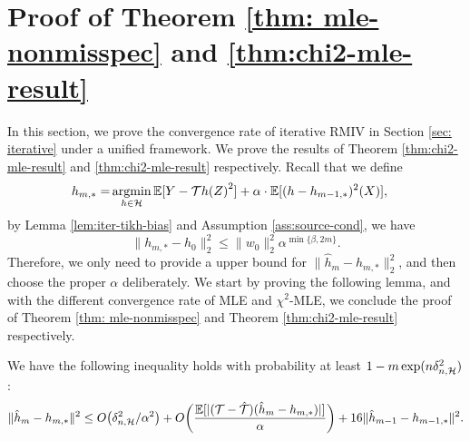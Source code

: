 \section{Proof of Theorem \ref{thm: mle-nonmisspec} and \ref{thm:chi2-mle-result}}\label{sec: proof-iterative}
In this section, we prove the convergence rate of iterative RMIV in Section \ref{sec: iterative} under a unified framework. We prove the results of Theorem \ref{thm:chi2-mle-result} and \ref{thm:chi2-mle-result} respectively. Recall that we define \begin{align*}
    h_{m, *} = &\mathop{\mathrm{argmin}}_{h\in\mathcal{H}} \mathbb{E}[{Y - {\mathcal{T}} h(Z)}^2]+ \alpha\cdot \mathbb{E}[(h - h_{m-1,*})^2(X)],
\end{align*}
by Lemma \ref{lem:iter-tikh-bias} and Assumption \ref{ass:source-cond}, we have $$
\|h_{m,*} - h_0\|_2^2 \leq \|w_0\|_2^2\alpha^{\min\{\beta,2m\}}.
$$
Therefore, we only need to provide a upper bound for $\|\hat{h}_m - h_{m,*}\|_2^2$, and then choose the proper $\alpha$ deliberately. We start by proving the following lemma, and with the different convergence rate of MLE and $\chi^2$-MLE, we conclude the proof of Theorem \ref{thm: mle-nonmisspec} and Theorem \ref{thm:chi2-mle-result} respectively.
\begin{lemma}\label{lem: iter-quadra}
   We have the following inequality holds with probability at least $1 - m\exp(n\delta_{n,\mathcal{H}}^2)$: $$\|\hat{h}_{m} - h_{m,*}\|^2 \leq O\big(\delta_{n,\mathcal{H}}^2/\alpha^2 
\big) + O\bigg(\frac{ \mathbb{E}[|({\mathcal{T}} - \hat{{\mathcal{T}}})(\hat{h}_{m} - h_{m,*})|]}{\alpha}\bigg)+ 16\|\hat{h}_{m-1} - h_{m-1,*}\|^2.
$$
\end{lemma}
